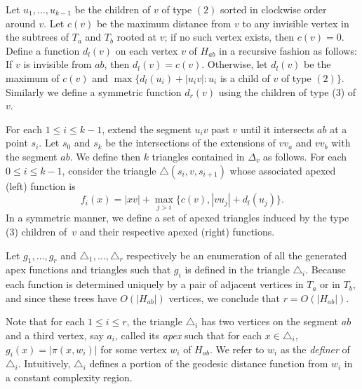 \documentclass[a4paper,UKenglish]{lipics}
\newcommand{\g}[2]{\ensuremath{|\pi(#1, #2)|}}
\begin{document}
Let $u_1, \ldots, u_{k-1}$ be the children of $v$ of type $(2)$ sorted in clockwise order around $v$.
Let $c(v)$ be the maximum distance from $v$ to any invisible vertex in the subtrees of $T_a$ and $T_b$ rooted at $v$; if no such vertex exists, then $c(v) = 0$. 
Define a function $d_l(v)$ on each vertex $v$ of $H_{ab}$ in a recursive fashion as follows:
If $v$ is invisible from $ab$, then $d_l(v) = c(v)$. 
Otherwise, let $d_l(v)$ be the maximum of $c(v)$ and $\max\{d_l(u_i) + |u_iv| : u_i$ is a child of $v$ of type $(2)\}$.
Similarly we define a symmetric function $d_r(v)$ using the children of type (3) of $v$.

For each $1\leq i\leq k-1$, extend the segment $u_iv$ past $v$ until it intersects $ab$ at a point $s_i$. Let $s_0$ and $s_k$ be the intersections of the extensions of $vv_a$ and $vv_b$ with the segment $ab$.
We define then $k$ triangles contained in $\Delta_v$ as follows. 
For each $0\leq i\leq k-1$, consider the triangle $\triangle(s_i, v, s_{i+1})$ whose associated apexed (left) function is 
$$f_i(x) = |xv| + \max_{j>i}\{c(v), |vu_j| + d_l(u_j)\}.$$
In a symmetric manner, we define a set of apexed triangles induced by the type (3) children of~$v$ and their respective apexed (right) functions.

Let $g_1, \ldots, g_r$ and $\triangle_1, \ldots, \triangle_r$ respectively be an enumeration of all the generated apex functions and triangles such that $g_i$ is defined in the triangle $\triangle_i$. Because each function is determined uniquely by a pair of adjacent vertices in $T_a$ or in $T_b$, and since these trees have $O(|H_{ab}|)$ vertices, we conclude that $r = O(|H_{ab}|)$. 

Note that for each $1\leq i\leq r$, the triangle $\triangle_i$ has two vertices on the segment $ab$ and a third vertex, say $a_i$, called its \emph{apex} such that for each $x\in \triangle_i$, $g_i(x) = \g{x}{w_i}$ for some vertex $w_i$ of $H_{ab}$. We refer to $w_i$ as the \emph{definer} of $\triangle_i$. Intuitively, $\triangle_i$ defines a portion of the geodesic distance function from $w_i$ in a constant complexity region. 
\end{document}
